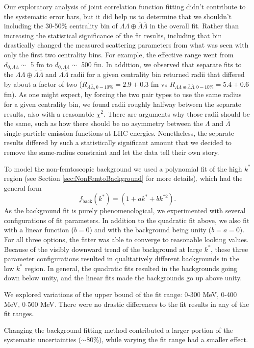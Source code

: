 Our exploratory analysis of joint correlation function fitting didn't contribute to the systematic error bars, but it did help us to determine that  we shouldn't including the 30-50\% centrality bin of $\Lambda\Lambda\oplus\bar{\Lambda}\bar{\Lambda}$ in the overall fit.
Rather than increasing the statistical significance of the fit results, including that bin drastically changed the measured scattering parameters from what was seen with only the first two centrality bins.
For example, the effective range went from $d_{0,\Lambda\Lambda}\sim$ 5 fm to $d_{0,\Lambda\Lambda}\sim$ 500 fm.
In addition, we observed that separate fits to the $\Lambda\Lambda\oplus\bar{\Lambda}\bar{\Lambda}$ and $\Lambda\bar{\Lambda}$ radii for a given centrality bin returned radii that differed by about a factor of  two ($R_{\Lambda\bar{\Lambda},0-10\%} = 2.9 \pm 0.3$ fm vs $R_{\Lambda\Lambda\oplus\bar{\Lambda}\bar{\Lambda},0-10\%} = 5.4 \pm 0.6$ fm).
As one might expect, by forcing the two pair types to use the same radius for a given centrality bin, we found radii roughly halfway between the separate results, also with a reasonable $\chi^2$.
There are arguments why those radii should be the same, such as how there should be no asymmetry between the $\Lambda$ and $\bar{\Lambda}$ single-particle emission functions at LHC energies. 
Nonetheless, the separate results differed by such a statistically significant amount that we decided to remove the same-radius constraint and let the data tell their own story.

To model the non-femtoscopic background we used a polynomial fit of the high $k^*$ region (see Section \ref{sec:NonFemtoBackground} for more details), which had the general form 
\begin{equation}
f_{\mathrm{back}}(k^*) = (1 + ak^* + bk^{*2}).
\end{equation}
As the background fit is purely phenomenological, we experimented with several configurations of fit parameters.
In addition to the quadratic fit above, we also fit with a linear function ($b = 0$) and with the background being unity ($b = a = 0$).
For all three options, the fitter was able to converge to reasonable looking values.
Because of the visibly downward trend of the background at large $k^*$, these three parameter configurations resulted in qualitatively different backgrounds in the low $k^*$ region.
In general, the quadratic fits resulted in the backgrounds going down below unity, and the linear fits made the backgrounds go up above unity.

We explored variations of the upper bound of the fit range: 0-300 MeV, 0-400 MeV, 0-500 MeV.
There were no drastic differences to the fit results in any of the fit ranges.

Changing the background fitting method contributed a larger portion of the systematic uncertainties ($\sim 80\%$), while varying the fit range had a smaller effect.